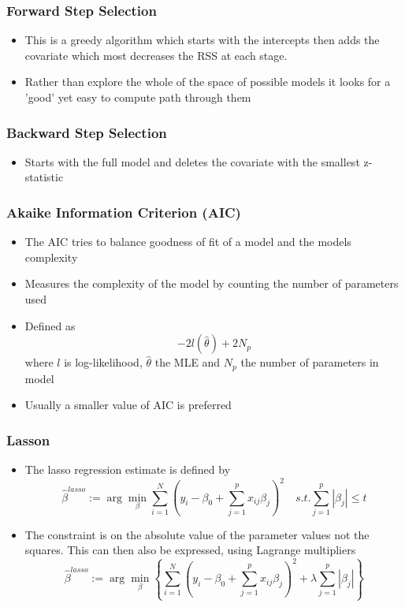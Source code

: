 \documentclass[11pt]{article}
\begin{document}
\subsubsection{Forward Step Selection}
\begin{itemize}
    \item This is a greedy algorithm which starts with the
    intercepts then adds the covariate which most
    decreases the RSS at each stage.
    \item Rather than explore the whole of the space of possible
    models it looks for a 'good' yet easy to compute path
    through them
\end{itemize}
\subsubsection{Backward Step Selection}
\begin{itemize}
    \item Starts with the full model and deletes the covariate with
    the smallest z-statistic
\end{itemize}
\subsubsection{Akaike Information Criterion (AIC)}
\begin{itemize}
    \item The AIC tries to balance goodness of fit of a model and the models complexity 
    \item Measures the complexity of the model by counting the number of parameters used 
    \item Defined as \[-2l(\hat{\theta})+2N_p\]    where $l$ is log-likelihood, $\hat{\theta}$ the MLE and $N_p$ the number of parameters in model 
    \item Usually a smaller value of AIC is preferred 
\end{itemize}
\subsubsection{Lasson}
\begin{itemize}
    \item The lasso regression estimate is defined by \[\hat{\beta}^{lasso}:=\arg\min_\beta\sum_{i=1}^{N}(y_i-\beta_0+\sum_{j=1}^{p}x_{ij}\beta_j)^2 \quad s.t. \sum_{j=1}^{p}|\beta_j|\leq t\]
    \item The constraint is on the absolute value of the parameter values not the squares. This can then also be expressed, using Lagrange multipliers \[\hat{\beta}^{lasso}:=\arg\min_\beta\left\{\sum_{i=1}^{N}(y_i-\beta_0+\sum_{j=1}^{p}x_{ij}\beta_j)^2+\lambda\sum_{j=1}^{p}|\beta_j|\right\}\]    
\end{itemize}
\newpage 
\end{document}
